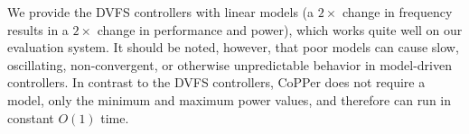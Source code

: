 We provide the DVFS controllers with linear models (\eg a $2\times$ change in frequency results in a $2\times$ change in performance and power), which works quite well on our evaluation system.
It should be noted, however, that poor models can cause slow, oscillating, non-convergent, or otherwise unpredictable behavior in model-driven controllers.
In contrast to the DVFS controllers, CoPPer does not require a model, only the minimum and maximum power values, and therefore can run in constant $O(1)$ time.
